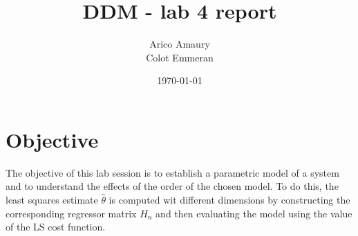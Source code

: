 \documentclass[10pt,twocolumn]{article}
\title{DDM - lab 4 report}
\author{Arico Amaury\\Colot Emmeran}
\date{\today}
\begin{document}
\maketitle

\section{Objective}
The objective of this lab session is to establish a parametric model of a system and to understand the effects of the order of the chosen model. To do this, the least squares estimate $\hat{\theta}$ is computed wit different dimensions by constructing the corresponding regressor matrix $H_n$ and then evaluating the model using the value of the LS cost function.
\end{document}
